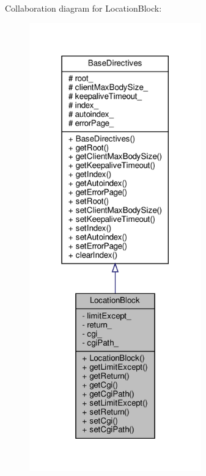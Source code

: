 Collaboration diagram for Location\+Block\+:
\nopagebreak
\begin{figure}[H]
\begin{center}
\leavevmode
\includegraphics[height=550pt]{classft_1_1_location_block__coll__graph}
\end{center}
\end{figure}
